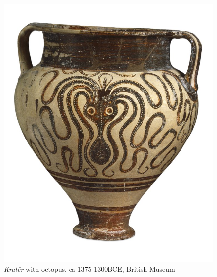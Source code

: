 \begin{figure}[htbp]
     \centering
         \includegraphics[scale=0.25]{graphics/krater.jpg}
     \caption{\emph{Kratēr} with octopus, ca 1375-1300BCE, British Museum}
     \label{fig:krater}
\end{figure}

